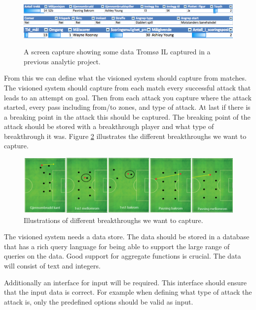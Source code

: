 \begin{figure}[ht!]
\centering
\includegraphics[width=1\textwidth]{images/requirement/prev_domain_model1}
\includegraphics[width=1\textwidth]{images/requirement/prev_domain_model2}
\includegraphics[width=1\textwidth]{images/requirement/prev_domain_model3}
\caption{A screen capture showing some data Tromsø IL captured in a previous analytic project.}
\label{fig:prevdomainmodel}
\end{figure}

From this we can define what the visioned system should capture from matches. The visioned system should capture from each match every successful attack that leads to an attempt on goal. Then from each attack you capture where the attack started, every pass including from/to zones, and type of attack. At last if there is a breaking point in the attack this should be captured. The breaking point of the attack should be stored with a breakthrough player and what type of breakthrough it was. Figure \ref{fig:different_break} illustrates the different breakthroughs we want to capture.

\begin{figure}[ht!]
\centering
\includegraphics[width=1\textwidth]{images/general/different_breakthroughs.png}
\caption{Illustrations of different breakthroughs we want to capture.}
\label{fig:different_break}
\end{figure}

The visioned system needs a data store. The data should be stored in a database that has a rich query language for being able to support the large range of queries on the data. Good support for aggregate functions is crucial. The data will consist of text and integers.

Additionally an interface for input will be required. This interface should ensure that the input data is correct. For example when defining what type of attack the attack is, only the predefined options should be valid as input. 

